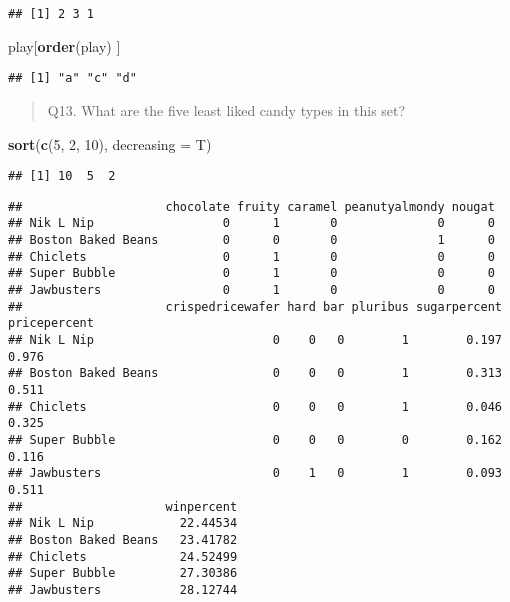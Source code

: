 \documentclass[
]{article}
\newenvironment{Shaded}{\begin{snugshade}}{\end{snugshade}}
\newcommand{\AttributeTok}[1]{\textcolor[rgb]{0.13,0.29,0.53}{#1}}
\newcommand{\DecValTok}[1]{\textcolor[rgb]{0.00,0.00,0.81}{#1}}
\newcommand{\FunctionTok}[1]{\textcolor[rgb]{0.13,0.29,0.53}{\textbf{#1}}}
\newcommand{\NormalTok}[1]{#1}
\newcommand{\SpecialCharTok}[1]{\textcolor[rgb]{0.81,0.36,0.00}{\textbf{#1}}}
\begin{document}
\begin{verbatim}
## [1] 2 3 1
\end{verbatim}

\begin{Shaded}
\begin{Highlighting}[]
\NormalTok{play[}\FunctionTok{order}\NormalTok{(play) ]}
\end{Highlighting}
\end{Shaded}

\begin{verbatim}
## [1] "a" "c" "d"
\end{verbatim}

\begin{quote}
Q13. What are the five least liked candy types in this set?
\end{quote}

\begin{Shaded}
\begin{Highlighting}[]
\FunctionTok{sort}\NormalTok{(}\FunctionTok{c}\NormalTok{(}\DecValTok{5}\NormalTok{, }\DecValTok{2}\NormalTok{, }\DecValTok{10}\NormalTok{), }\AttributeTok{decreasing =}\NormalTok{ T)}
\end{Highlighting}
\end{Shaded}

\begin{verbatim}
## [1] 10  5  2
\end{verbatim}

\begin{Shaded}
\end{Shaded}

\begin{verbatim}
##                    chocolate fruity caramel peanutyalmondy nougat
## Nik L Nip                  0      1       0              0      0
## Boston Baked Beans         0      0       0              1      0
## Chiclets                   0      1       0              0      0
## Super Bubble               0      1       0              0      0
## Jawbusters                 0      1       0              0      0
##                    crispedricewafer hard bar pluribus sugarpercent pricepercent
## Nik L Nip                         0    0   0        1        0.197        0.976
## Boston Baked Beans                0    0   0        1        0.313        0.511
## Chiclets                          0    0   0        1        0.046        0.325
## Super Bubble                      0    0   0        0        0.162        0.116
## Jawbusters                        0    1   0        1        0.093        0.511
##                    winpercent
## Nik L Nip            22.44534
## Boston Baked Beans   23.41782
## Chiclets             24.52499
## Super Bubble         27.30386
## Jawbusters           28.12744
\end{verbatim}
\end{document}
